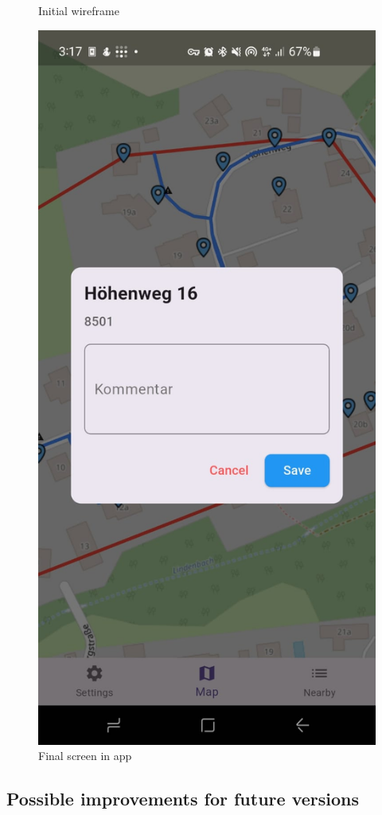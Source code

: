 \begin{figure}[H]
\begin{minipage}{0.3\textwidth}
        \caption{Initial wireframe}
    \end{minipage}
    \hspace{2cm}
    \begin{minipage}{0.3\textwidth}
        \centering
        \includegraphics[width=\textwidth]{images/paul/wireframes/finalDetails.jpeg}
        \caption{Final screen in app}
    \end{minipage}
\end{figure}

\subsection{Possible improvements for future versions}

\newpage